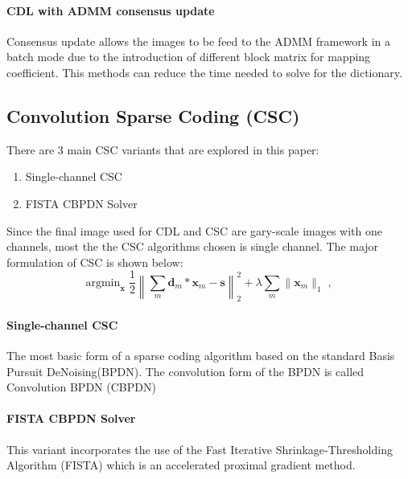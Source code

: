 \paragraph{CDL with ADMM consensus update}
Consensus update allows the images to be feed to the ADMM framework in a 
batch mode due to the introduction of different block matrix for mapping 
coefficient. This methods can reduce the time needed to solve for the 
dictionary.

\subsection{Convolution Sparse Coding (CSC)}
There are 3 main CSC variants that are explored in this paper:
\begin{enumerate}
    \item Single-channel CSC
    \item FISTA CBPDN Solver
\end{enumerate}
Since the final image used for CDL and CSC are gary-scale images
with one channels, most the the CSC algorithms chosen is single channel.
The major formulation of CSC is shown below:
\begin{equation}
    \mathrm{argmin}_\mathbf{x} \; \frac{1}{2} \left\| \sum_m \mathbf{d}_m * \mathbf{x}_{m} - \mathbf{s} \right\|_2^2 + \lambda \sum_m \| \mathbf{x}_{m} \|_1 \;,
\end{equation}

\paragraph{Single-channel CSC}
The most basic form of a sparse coding algorithm based on
the standard Basis Pursuit DeNoising(BPDN). The convolution 
form of the BPDN is called Convolution BPDN (CBPDN) 

\paragraph{FISTA CBPDN Solver}
This variant incorporates the use of the Fast Iterative 
Shrinkage-Thresholding Algorithm (FISTA) which is an accelerated
proximal gradient method.

